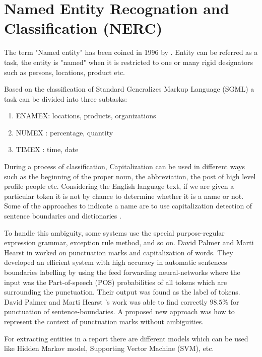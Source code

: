 \section{ Named Entity Recognation and Classification   (NERC)}

The term "Named entity" has been coined in 1996 by  \citep{grishman1996design}.
Entity can be referred as a task, the entity is "named" when it is restricted to one or many rigid designators \citep{sharnagat2014named} such as persons, locations, product etc.

Based on the classification of Standard Generalizes Markup Language (SGML) a task can be divided into three subtasks:
\begin{enumerate}
\item ENAMEX: locations, products, organizations
\item NUMEX : percentage, quantity
\item TIMEX : time, date
\end{enumerate}
During a process of classification, Capitalization can be used in different ways such as the beginning of the proper noun, the abbreviation, the post of high level profile people etc. Considering the English language text, if we are given a  particular token it is not by chance  to  determine whether it is a name or not. Some of the approaches to indicate a name are to  use capitalization  detection of sentence boundaries and dictionaries \citep{baluja2000applying}.

To handle this ambiguity, some systems use the special purpose-regular expression grammar, exception rule method, and so on.  David Palmer and Marti Hearst in  \citep{palmer1994adaptive} worked on punctuation marks and capitalization of words. They developed an efficient system with high accuracy in automatic sentences boundaries labelling   by using the feed forwarding neural-networks where the input was the Part-of-speech (POS) probabilities of all tokens which are surrounding the punctuation. Their output was found as the label of tokens.  David Palmer and Marti Hearst 's work was able to find correctly $98.5\%$ for punctuation of  sentence-boundaries. A proposed  new approach was how to represent the context of punctuation marks without ambiguities.

For extracting entities in a report there are different models which can be used like Hidden Markov model, Supporting Vector Machine (SVM), etc.

